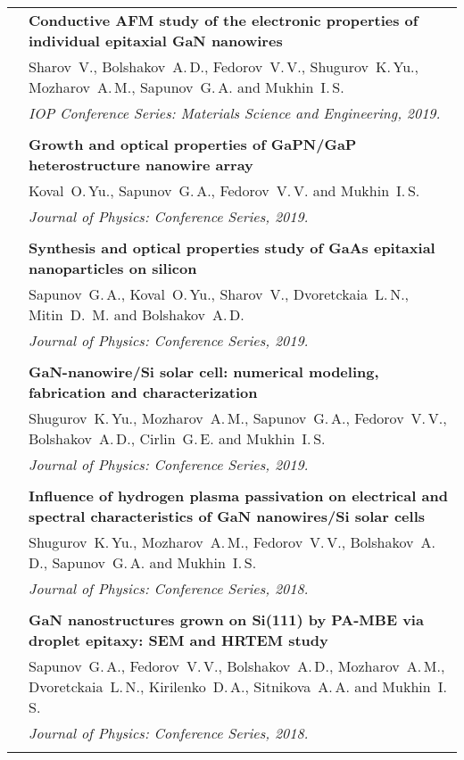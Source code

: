 \documentclass[letterpaper, 11pt]{article}
\begin{document}
\begin{longtable}{p{1.3in}p{4.8in}}
        & \textbf{Conductive AFM study of the electronic properties of
        individual epitaxial GaN nanowires} \\
        & Sharov~V., Bolshakov~A.\,D., Fedorov~V.\,V., Shugurov~K.\,Yu.,
        Mozharov~A.\,M., Sapunov~G.\,A. and Mukhin~I.\,S. \\
		& \textit{IOP Conference Series: Materials Science and Engineering, 2019.}\\
		& \\
		
        & \textbf{Growth and optical properties of GaPN/GaP heterostructure
        nanowire array} \\
        & Koval~O.\,Yu., Sapunov~G.\,A., Fedorov~V.\,V. and Mukhin~I.\,S. \\
		& \textit{Journal of Physics: Conference Series, 2019.}\\
		& \\
		
        & \textbf{Synthesis and optical properties study of GaAs epitaxial
        nanoparticles on silicon} \\
        & Sapunov~G.\,A., Koval~O.\,Yu., Sharov~V., Dvoretckaia~L.\,N.,
        Mitin~D.\, M. and Bolshakov~A.\,D. \\
		& \textit{Journal of Physics: Conference Series, 2019.}\\
		& \\
		
        & \textbf{GaN-nanowire/Si solar cell: numerical modeling, fabrication
        and characterization} \\
        & Shugurov~K.\,Yu., Mozharov~A.\,M., Sapunov~G.\,A., Fedorov~V.\,V.,
        Bolshakov~A.\,D., Cirlin~G.\,E. and Mukhin~I.\,S. \\
		& \textit{Journal of Physics: Conference Series, 2019.}\\
		& \\
		
        & \textbf{Influence of hydrogen plasma passivation on electrical and
        spectral characteristics of GaN nanowires/Si solar cells} \\
        & Shugurov~K.\,Yu., Mozharov~A.\,M., Fedorov~V.\,V., Bolshakov~A.\,D.,
        Sapunov~G.\,A. and Mukhin~I.\,S. \\
		& \textit{Journal of Physics: Conference Series, 2018.}\\
		& \\
		
        & \textbf{GaN nanostructures grown on Si(111) by PA-MBE via droplet
        epitaxy: SEM and HRTEM study} \\
        & Sapunov~G.\,A., Fedorov~V.\,V., Bolshakov~A.\,D., Mozharov~A.\,M.,
        Dvoretckaia~L.\,N., Kirilenko~D.\,A., Sitnikova~A.\,A. and
        Mukhin~I.\,S. \\
		& \textit{Journal of Physics: Conference Series, 2018.}\\
		& \\
		

\end{longtable}
\end{document}
